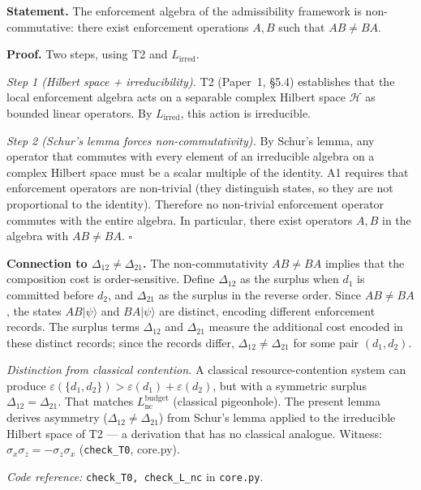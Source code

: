 \documentclass[11pt]{article}
\newcommand{\coderef}[2]{\smallskip\noindent\textit{Code reference:} \texttt{#1} in \texttt{#2}.}
\begin{document}
\begin{tcolorbox}[apfbox, title={Lemma $L_{\Delta\to\mathrm{nc}}$ (Interference Non-Closure Implies Non-Commutativity)}]
\textbf{Statement.}  The enforcement algebra of the admissibility framework is non-commutative: there exist enforcement operations $A, B$ such that $AB \ne BA$.

\smallskip\noindent\textbf{Proof.}  Two steps, using T2 and $L_{\mathrm{irred}}$.

\textit{Step 1 (Hilbert space + irreducibility).}  T2 (Paper~1, \S5.4) establishes that the local enforcement algebra acts on a separable complex Hilbert space $\mathcal{H}$ as bounded linear operators.  By $L_{\mathrm{irred}}$, this action is irreducible.

\textit{Step 2 (Schur's lemma forces non-commutativity).}  By Schur's lemma, any operator that commutes with every element of an irreducible algebra on a complex Hilbert space must be a scalar multiple of the identity.  A1 requires that enforcement operators are non-trivial (they distinguish states, so they are not proportional to the identity).  Therefore no non-trivial enforcement operator commutes with the entire algebra.  In particular, there exist operators $A, B$ in the algebra with $AB \ne BA$.  $\square$

\smallskip\noindent\textbf{Connection to $\Delta_{12} \ne \Delta_{21}$.}  The non-commutativity $AB \ne BA$ implies that the composition cost is order-sensitive.  Define $\Delta_{12}$ as the surplus when $d_1$ is committed before $d_2$, and $\Delta_{21}$ as the surplus in the reverse order.  Since $AB \ne BA$, the states $AB|\psi\rangle$ and $BA|\psi\rangle$ are distinct, encoding different enforcement records.  The surplus terms $\Delta_{12}$ and $\Delta_{21}$ measure the additional cost encoded in these distinct records; since the records differ, $\Delta_{12} \ne \Delta_{21}$ for some pair $(d_1, d_2)$.

\smallskip\noindent\textit{Distinction from classical contention.}  A classical resource-contention system can produce $\varepsilon(\{d_1,d_2\}) > \varepsilon(d_1) + \varepsilon(d_2)$, but with a symmetric surplus $\Delta_{12} = \Delta_{21}$.  That matches $L_{\mathrm{nc}}^{\mathrm{budget}}$ (classical pigeonhole).  The present lemma derives asymmetry ($\Delta_{12} \ne \Delta_{21}$) from Schur's lemma applied to the irreducible Hilbert space of T2 --- a derivation that has no classical analogue.  Witness: $\sigma_x \sigma_z = -\sigma_z \sigma_x$ (\texttt{check\_T0}, core.py).

\coderef{check\_T0, check\_L\_nc}{core.py}
\end{tcolorbox}
\end{document}
